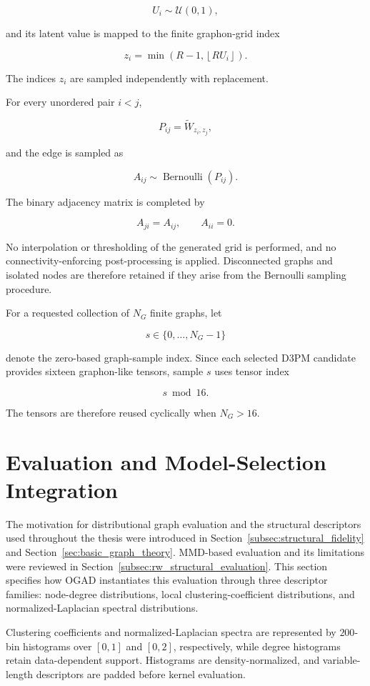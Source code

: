 \[
U_i
\sim
\mathcal{U}(0,1),
\]

and its latent value is mapped to the finite graphon-grid index

\[
z_i
=
\min
\left(
R-1,
\left\lfloor RU_i \right\rfloor
\right).
\]

The indices \(z_i\) are sampled independently with replacement.

For every unordered pair \(i<j\),

\[
P_{ij}
=
\widetilde{W}_{z_i,z_j},
\]

and the edge is sampled as

\[
A_{ij}
\sim
\operatorname{Bernoulli}
\left(
P_{ij}
\right).
\]

The binary adjacency matrix is completed by

\[
A_{ji}=A_{ij},
\qquad
A_{ii}=0.
\]

No interpolation or thresholding of the generated grid is performed, and no connectivity-enforcing post-processing is applied. Disconnected graphs and isolated nodes are therefore retained if they arise from the Bernoulli sampling procedure.

For a requested collection of \(N_G\) finite graphs, let

\[
s\in\{0,\ldots,N_G-1\}
\]

denote the zero-based graph-sample index. Since each selected D3PM candidate provides sixteen graphon-like tensors, sample \(s\) uses tensor index

\[
s\bmod 16.
\]

The tensors are therefore reused cyclically when \(N_G>16\).


\section{Evaluation and Model-Selection Integration}
\label{sec:method_ggme}

The motivation for distributional graph evaluation and the structural descriptors used throughout the thesis were introduced in Section~\ref{subsec:structural_fidelity} and Section~\ref{sec:basic_graph_theory}. MMD-based evaluation and its limitations were reviewed in Section~\ref{subsec:rw_structural_evaluation}.  This section specifies how OGAD instantiates this evaluation through three descriptor families: node-degree distributions, local clustering-coefficient distributions, and normalized-Laplacian spectral distributions.

Clustering coefficients and normalized-Laplacian spectra are represented by \(200\)-bin histograms over \([0,1]\) and \([0,2]\), respectively, while degree histograms retain data-dependent support. Histograms are density-normalized, and variable-length descriptors are padded before kernel evaluation.

